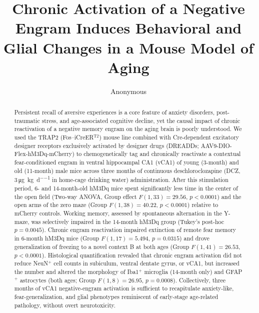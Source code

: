 \documentclass[11pt]{article}
\title{Chronic Activation of a Negative Engram Induces Behavioral and Glial Changes in a Mouse Model of Aging}
\author{Anonymous}
\date{}
\begin{document}
\maketitle

\begin{abstract}
Persistent recall of aversive experiences is a core feature of anxiety disorders, post-traumatic stress, and age-associated cognitive decline, yet the causal impact of chronic reactivation of a negative memory engram on the aging brain is poorly understood. We used the TRAP2 (Fos--iCreER$^{\mathrm{T2}}$) mouse line combined with Cre-dependent excitatory designer receptors exclusively activated by designer drugs (DREADDs; AAV9-DIO-Flex-hM3Dq-mCherry) to chemogenetically tag and chronically reactivate a contextual fear-conditioned engram in ventral hippocampal CA1 (vCA1) of young (3-month) and old (11-month) male mice across three months of continuous deschloroclozapine (DCZ, 3\,\si{\micro\gram\per\kilogram\per\day} in home-cage drinking water) administration. After this stimulation period, 6- and 14-month-old hM3Dq mice spent significantly less time in the center of the open field (Two-way ANOVA, Group effect $F(1,33)=29.56$, $p<0.0001$) and the open arms of the zero maze (Group $F(1,38)=40.22$, $p<0.0001$) relative to mCherry controls. Working memory, assessed by spontaneous alternation in the Y-maze, was selectively impaired in the 14-month hM3Dq group (Tukey's post-hoc $p=0.0045$). Chronic engram reactivation impaired extinction of remote fear memory in 6-month hM3Dq mice (Group $F(1,17)=5.494$, $p=0.0315$) and drove generalization of freezing to a novel context B at both ages (Group $F(1,41)=26.53$, $p<0.0001$). Histological quantification revealed that chronic engram activation did not reduce NeuN$^{+}$ cell counts in subiculum, ventral dentate gyrus, or vCA1, but increased the number and altered the morphology of Iba1$^{+}$ microglia (14-month only) and GFAP$^{+}$ astrocytes (both ages; Group $F(1,8)=26.95$, $p=0.0008$). Collectively, three months of vCA1 negative-engram activation is sufficient to recapitulate anxiety-like, fear-generalization, and glial phenotypes reminiscent of early-stage age-related pathology, without overt neurotoxicity.
\end{abstract}
\end{document}
